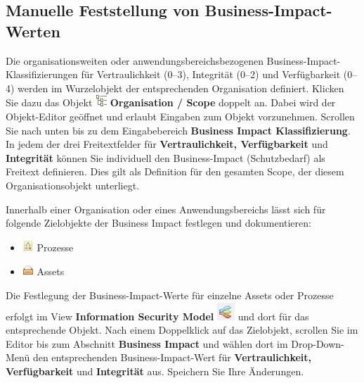 \documentclass[a4paper,10pt]{book}
\begin{document}
\subsection{Manuelle Feststellung von Business-Impact-Werten}

Die organisationsweiten oder anwendungsbereichsbezogenen
Business-Impact-Klassifizierungen für Vertraulichkeit (0--3), Integrität (0--2)
und Verfügbarkeit (0--4) werden im Wurzelobjekt der entsprechenden Organisation
definiert. Klicken Sie dazu das Objekt
\includegraphics[height=2ex]{Icon/GS_Modell.png} \textbf{Organisation / Scope}
doppelt an. Dabei wird der Objekt-Editor geöffnet und erlaubt Eingaben zum
Objekt vorzunehmen. Scrollen Sie nach unten bis zu dem Eingabebereich
\textbf{Business Impact Klassifizierung}. In jedem der drei Freitextfelder für
\textbf{Vertraulichkeit, Verfügbarkeit} und \textbf{Integrität} können Sie
individuell den Business-Impact (Schutzbedarf) als Freitext definieren. Dies
gilt als Definition für den gesamten Scope, der diesem Organisationsobjekt
unterliegt.

Innerhalb einer Organisation oder eines Anwendungsbereichs lässt sich
für folgende Zielobjekte der Business Impact festlegen und
dokumentieren:

\begin{itemize}
\item \includegraphics[height=2ex]{Icon/Prozesse.png} Prozesse
\item \includegraphics[height=2ex]{Icon/Asset.png} Assets
\end{itemize}

Die Festlegung der Business-Impact-Werte für einzelne Assets oder
Prozesse erfolgt im View \textbf{Information Security Model}
\includegraphics[height=2ex]{Icon/Informationssicherheitsmodell.png} und dort
für das entsprechende Objekt. Nach einem Doppelklick auf das Zielobjekt,
scrollen Sie im Editor bis zum Abschnitt \textbf{Business Impact} und wählen
dort im Drop-Down-Menü den entsprechenden Business-Impact-Wert für
\textbf{Vertraulichkeit, Verfügbarkeit} und \textbf{Integrität} aus. Speichern
Sie Ihre Änderungen.
\end{document}
